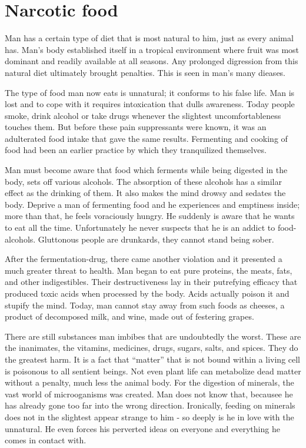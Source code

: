 \documentclass[landscape,twocolumn,letterpaper]{article}
\begin{document}
\section{Narcotic food}

Man has a certain type of diet that is most natural to him, just as
every animal has. Man's body established itself in a tropical
environment where fruit was most dominant and readily available at all
seasons. Any prolonged digression from this natural diet ultimately
brought penalties. This is seen in man's many dieases.

The type of food man now eats is unnatural; it conforms to his false
life. Man is lost and to cope with it requires intoxication that dulls
awareness. Today people smoke, drink alcohol or take drugs whenever
the slightest uncomfortableness touches them. But before these pain
suppressants were known, it was an adulterated food intake that gave
the same results. Fermenting and cooking of food had been an earlier
practice by which they tranquilized themselves.

Man must become aware that food which ferments while being digested in
the body, sets off various alcohols. The absorption of these alcohols
has a similar effect as the drinking of them. It also makes the mind
drowsy and sedates the body. Deprive a man of fermenting food and he
experiences and emptiness inside; more than that, he feels voraciously
hungry. He suddenly is aware that he wants to eat all the
time. Unfortunately he never suspects that he is an addict to
food-alcohols. Gluttonous people are drunkards, they cannot stand
being sober.

After the fermentation-drug, there came another violation and it
presented a much greater threat to health. Man began to eat pure
proteins, the meats, fats, and other indigestibles. Their
destructiveness lay in their putrefying efficacy that produced toxic
acids when processed by the body. Acids actually poison it and stupify
the mind. Today, man cannot stay away from such foods as cheeses, a
product of decomposed milk, and wine, made out of festering grapes.

There are still substances man imbibes that are undoubtedly the
worst. These are the inanimates, the vitamins, medicines, drugs,
sugars, salts, and spices. They do the greatest harm. It is a fact
that ``matter'' that is not bound within a living cell is poisonous to
all sentient beings. Not even plant life can metabolize dead matter
without a penalty, much less the animal body. For the digestion of
minerals, the vast world of microoganisms was created. Man does not
know that, becausee he has already gone too far into the wrong
direction. Ironically, feeding on minerals does not in the slightest
appear strange to him - so deeply is he in love with the unnatural. He
even forces his perverted ideas on everyone and everything he comes in
contact with.
\end{document}
